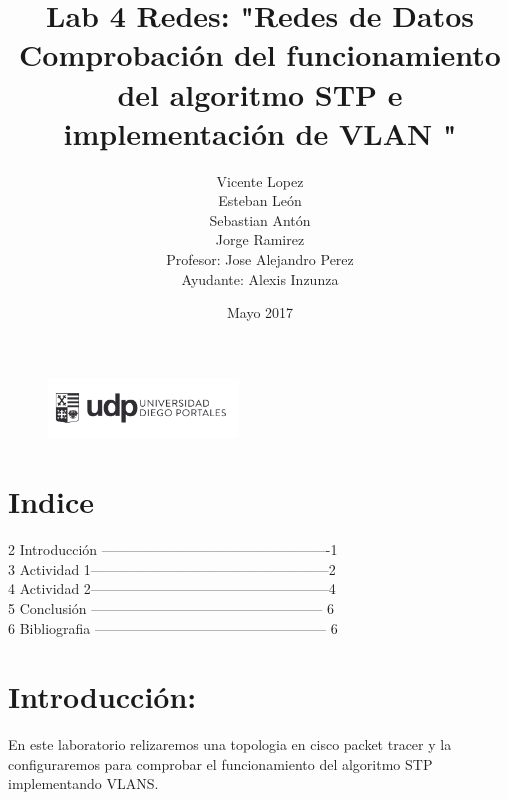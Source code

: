 \documentclass{article}
\title{Lab 4 Redes: "Redes de Datos
Comprobación del funcionamiento del algoritmo STP e
implementación de VLAN
"}
\author{Vicente Lopez\\Esteban León\\Sebastian Antón\\Jorge Ramirez\\Profesor: Jose Alejandro Perez\\Ayudante: Alexis Inzunza}
\date{Mayo 2017}
\begin{document}
\begin{figure}[h]
\includegraphics[width=0.45\textwidth]{logo_udp.png}
\maketitle
\end{figure}

\section{Indice}
2 Introducción -------------------------------------------------1\\
3 Actividad 1---------------------------------------------------2\\
4 Actividad 2---------------------------------------------------4\\
5 Conclusión -------------------------------------------------- 6\\
6 Bibliografia -------------------------------------------------- 6\\

\section{Introducción:}
En este laboratorio relizaremos una topologia en cisco packet tracer y la configuraremos para comprobar el funcionamiento del algoritmo STP implementando VLANS.\\\\
\end{document}

